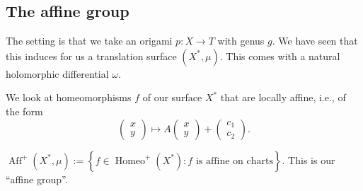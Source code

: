 \documentclass[reqno]{amsart} 
\numberwithin{theorem}{section}
\numberwithin{equation}{section}
\begin{document}
\subsection{The affine group}

The setting is that we take an origami $p : X \rightarrow T$ with genus $g$.  We have seen that this induces for us a translation surface $(X^\ast, \mu)$.  This comes with a natural holomorphic differential $\omega$.

We look at homeomorphisms $f$ of our surface $X^\ast$ that are locally affine, i.e., of the form
\begin{equation*}
  \begin{pmatrix}
    x    \\
    y
  \end{pmatrix}
  \mapsto A
  \begin{pmatrix}
    x    \\
    y
  \end{pmatrix}
  +
  \begin{pmatrix}
    c_1    \\
    c_2
  \end{pmatrix}.
\end{equation*}

\begin{definition}
  $  \operatorname{Aff}^+(X^\ast, \mu) := \left\{ f \in \operatorname{Homeo}^+(X^\ast) : f \text{ is affine on charts} \right\}$.  This is our ``affine group''.
\end{definition}
\end{document}
